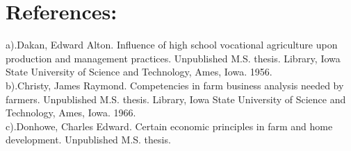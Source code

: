 \documentclass[10pt,letterpaper]{article}
\begin{document}
\section{References:}
a).Dakan, Edward Alton. Influence of high school vocational agriculture upon production and management practices. Unpublished M.S. thesis. Library, Iowa State University of Science and Technology, Ames, Iowa. 1956.
\\b).Christy, James Raymond. Competencies in farm business analysis needed by farmers. Unpublished M.S. thesis. Library, Iowa State University of Science and Technology, Ames, Iowa. 1966. 
\\c).Donhowe, Charles Edward. Certain economic principles in farm and home development. Unpublished M.S. thesis. 
\end{document}
